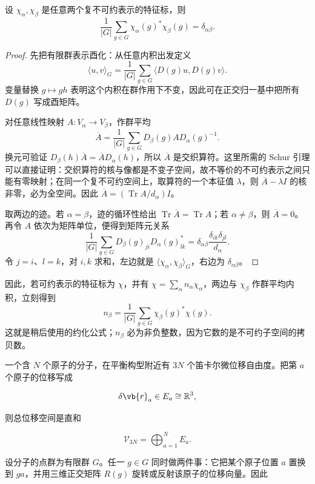 \begin{theorem}[有限群特征标正交关系]
设 \(\chi_\alpha,\chi_\beta\) 是任意两个复不可约表示的特征标，则
\[
\frac1{|G|}\sum_{g\in G}\chi_\alpha(g)^*\chi_\beta(g)
=\delta_{\alpha\beta}.
\]
\end{theorem}

\begin{proof}
先把有限群表示酉化：从任意内积出发定义
\[
\langle u,v\rangle_G
=\frac1{|G|}\sum_{g\in G}\langle D(g)u,D(g)v\rangle.
\]
变量替换 \(g\mapsto gh\) 表明这个内积在群作用下不变，因此可在正交归一基中把所有 \(D(g)\) 写成酉矩阵。

对任意线性映射 \(A:V_\alpha\to V_\beta\)，作群平均
\[
\overline A=\frac1{|G|}\sum_{g\in G}
D_\beta(g)A D_\alpha(g)^{-1}.
\]
换元可验证
\(D_\beta(h)\overline A=\overline A D_\alpha(h)\)，所以
\(\overline A\) 是交织算符。这里所需的 Schur 引理可以直接证明：交织算符的核与像都是不变子空间，故不等价的不可约表示之间只能有零映射；在同一个复不可约空间上，取算符的一个本征值 \(\lambda\)，则 \(\overline A-\lambda I\) 的核非零，必为全空间。因此 \(\overline A=(\operatorname{Tr}A/d_\alpha)I\)。

取两边的迹。若 \(\alpha=\beta\)，迹的循环性给出 \(\operatorname{Tr}\overline A=\operatorname{Tr}A\)；若 \(\alpha\ne\beta\)，则 \(\overline A=0\)。再令 \(A\) 依次为矩阵单位，便得到矩阵元关系
\[
\frac1{|G|}\sum_{g\in G}
D_\beta(g)_{ji}D_\alpha(g)_{lk}^{*}
=\delta_{\alpha\beta}\frac{\delta_{ik}\delta_{jl}}{d_\alpha}.
\]
令 \(j=i\)、\(l=k\)，对 \(i,k\) 求和，左边就是 \(\langle\chi_\alpha,\chi_\beta\rangle_G\)，右边为 \(\delta_{\alpha\beta}\)。
\end{proof}

因此，若可约表示的特征标为 \(\chi\)，并有
\(\chi=\sum_\alpha n_\alpha\chi_\alpha\)，两边与
\(\chi_\beta\) 作群平均内积，立刻得到
\[
n_\beta=\frac1{|G|}\sum_{g\in G}\chi_\beta(g)^*\chi(g).
\]
这就是稍后使用的约化公式；\(n_\beta\) 必为非负整数，因为它数的是不可约子空间的拷贝数。

一个含 \(N\) 个原子的分子，在平衡构型附近有 \(3N\) 个笛卡尔微位移自由度。把第 \(a\) 个原子的位移写成

\[
\delta\vb{r}_a\in E_a\cong\mathbb R^3,
\]

则总位移空间是直和

\begin{equation}
\mathcal V_{3N}
=\bigoplus_{a=1}^{N}E_a.
\label{eq:molecular-displacement-representation}
\end{equation}

设分子的点群为有限群 \(G\)。任一 \(g\in G\) 同时做两件事：它把某个原子位置 \(a\) 置换到 \(g a\)，并用三维正交矩阵 \(R(g)\) 旋转或反射该原子的位移向量。因此

